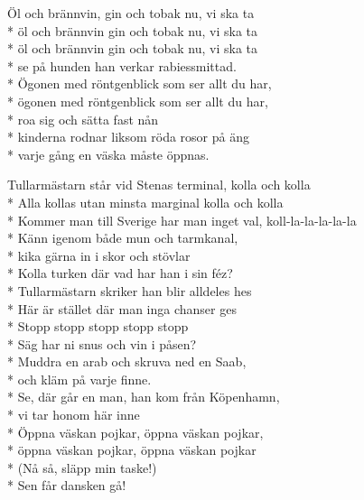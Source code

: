 \begin{SongText}[Tullarmästarn]
\begin{SongVerse}
    \end{SongVerse}
    \begin{SongVerse}
        Öl och brännvin, gin och tobak nu, vi ska ta\\*%
        öl och brännvin gin och tobak nu, vi ska ta\\*%
        öl och brännvin gin och tobak nu, vi ska ta\\*%
        se på hunden han verkar rabiessmittad.\\*%
        Ögonen med röntgenblick som ser allt du har,\\*%
        ögonen med röntgenblick som ser allt du har,\\*%
        roa sig och sätta fast nån\\*%
        kinderna rodnar liksom röda rosor på äng\\*%
        varje gång en väska måste öppnas.
    \end{SongVerse}
    \begin{SongVerse}
        Tullarmästarn står vid Stenas terminal, kolla och kolla\\*%
        Alla kollas utan minsta marginal kolla och kolla\\*%
        Kommer man till Sverige har man inget val, koll-la-la-la-la-la\\*%
        Känn igenom både mun och tarmkanal,\\*%
        kika gärna in i skor och stövlar\\*%
        Kolla turken där vad har han i sin féz?\\*%
        Tullarmästarn skriker han blir alldeles hes\\*%
        Här är stället där man inga chanser ges\\*%
        Stopp stopp stopp stopp stopp\\*%
        Säg har ni snus och vin i påsen?\\*%
        Muddra en arab och skruva ned en Saab,\\*%
        och kläm på varje finne.\\*%
        Se, där går en man, han kom från Köpenhamn,\\*%
        vi tar honom här inne\\*%
        Öppna väskan pojkar, öppna väskan pojkar,\\*%
        öppna väskan pojkar, öppna väskan pojkar\\*%
        (Nå så, släpp min taske!)\\*%
        Sen får dansken gå!
    \end{SongVerse}
\end{SongText}
